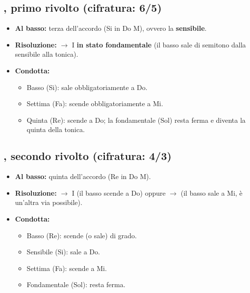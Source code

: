 \subsection{, primo rivolto (cifratura: 6/5)}
\begin{itemize}
    \item \textbf{Al basso:} terza dell'accordo (Si in Do M), ovvero la \textbf{sensibile}.
    \item \textbf{Risoluzione:} $\rightarrow$ I \textbf{in stato fondamentale} (il basso sale di semitono dalla sensibile alla tonica).
    \item \textbf{Condotta:}
    \begin{itemize}
        \item Basso (Si): sale obbligatoriamente a Do.
        \item Settima (Fa): scende obbligatoriamente a Mi.
        \item Quinta (Re): scende a Do; la fondamentale (Sol) resta ferma e diventa la quinta della tonica.
    \end{itemize}
\end{itemize}

\begin{esempio}
	\label{ex:v65}
\end{esempio}

\subsection{, secondo rivolto (cifratura: 4/3)}
\begin{itemize}
    \item \textbf{Al basso:} quinta dell'accordo (Re in Do M).
    \item \textbf{Risoluzione:} $\rightarrow$ I (il basso scende a Do) oppure $\rightarrow$  (il basso sale a Mi, è un'altra via possibile).
    \item \textbf{Condotta:}
    \begin{itemize}
        \item Basso (Re): scende (o sale) di grado.
        \item Sensibile (Si): sale a Do.
        \item Settima (Fa): scende a Mi.
        \item Fondamentale (Sol): resta ferma.
    \end{itemize}
\end{itemize}

